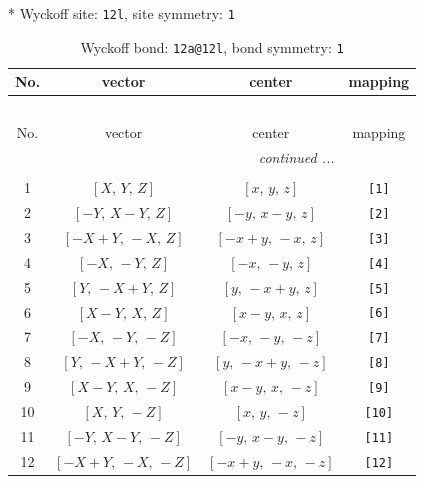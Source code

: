 \documentclass[fleqn,8pt]{jsarticle}
\begin{document}
* Wyckoff site: {\tt 12l}, site symmetry: {\tt 1}
\renewcommand{\arraystretch}{1.2}
\begin{longtable}{cccc}
\caption{Wyckoff bond: {\tt 12a@12l}, bond symmetry: {\tt 1}}
 \\
 \hline \hline
No. & vector & center & mapping \\ \hline \endfirsthead

\multicolumn{3}{l}{\tablename\ \thetable{}} \\
 \hline \hline
No. & vector & center & mapping \\ \hline \endhead

 \hline \hline
\multicolumn{3}{r}{\footnotesize\it continued ...} \\ \endfoot

 \hline \hline
\multicolumn{3}{r}{} \\ \endlastfoot

1 & $\left[ X,\, Y,\, Z \right]$ & $\left[ x,\, y,\, z \right]$ & {\tt [1]} \\ \hline
2 & $\left[ - Y,\, X - Y,\, Z \right]$ & $\left[ - y,\, x - y,\, z \right]$ & {\tt [2]} \\ \hline
3 & $\left[ - X + Y,\, - X,\, Z \right]$ & $\left[ - x + y,\, - x,\, z \right]$ & {\tt [3]} \\ \hline
4 & $\left[ - X,\, - Y,\, Z \right]$ & $\left[ - x,\, - y,\, z \right]$ & {\tt [4]} \\ \hline
5 & $\left[ Y,\, - X + Y,\, Z \right]$ & $\left[ y,\, - x + y,\, z \right]$ & {\tt [5]} \\ \hline
6 & $\left[ X - Y,\, X,\, Z \right]$ & $\left[ x - y,\, x,\, z \right]$ & {\tt [6]} \\ \hline
7 & $\left[ - X,\, - Y,\, - Z \right]$ & $\left[ - x,\, - y,\, - z \right]$ & {\tt [7]} \\ \hline
8 & $\left[ Y,\, - X + Y,\, - Z \right]$ & $\left[ y,\, - x + y,\, - z \right]$ & {\tt [8]} \\ \hline
9 & $\left[ X - Y,\, X,\, - Z \right]$ & $\left[ x - y,\, x,\, - z \right]$ & {\tt [9]} \\ \hline
10 & $\left[ X,\, Y,\, - Z \right]$ & $\left[ x,\, y,\, - z \right]$ & {\tt [10]} \\ \hline
11 & $\left[ - Y,\, X - Y,\, - Z \right]$ & $\left[ - y,\, x - y,\, - z \right]$ & {\tt [11]} \\ \hline
12 & $\left[ - X + Y,\, - X,\, - Z \right]$ & $\left[ - x + y,\, - x,\, - z \right]$ & {\tt [12]} \\
\end{longtable}
\end{document}
